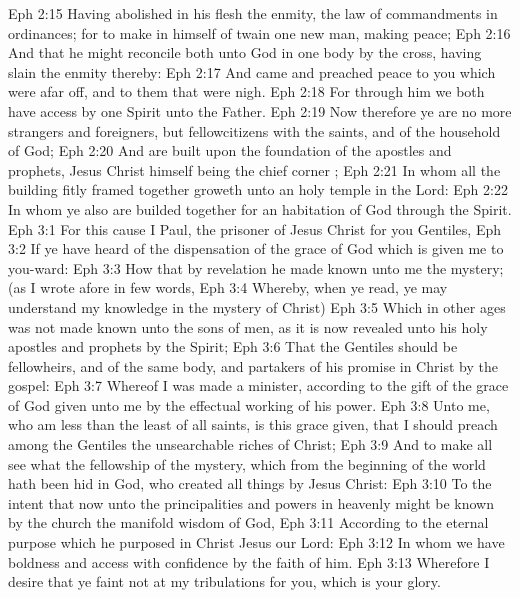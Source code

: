 \vs Eph 2:15 Having abolished in his flesh the enmity,  the law of commandments  in ordinances; for to make in himself of twain one new man,  making peace;
\vs Eph 2:16 And that he might reconcile both unto God in one body by the cross, having slain the enmity thereby:
\vs Eph 2:17 And came and preached peace to you which were afar off, and to them that were nigh.
\vs Eph 2:18 For through him we both have access by one Spirit unto the Father.
\vs Eph 2:19 Now therefore ye are no more strangers and foreigners, but fellowcitizens with the saints, and of the household of God;
\vs Eph 2:20 And are built upon the foundation of the apostles and prophets, Jesus Christ himself being the chief corner ;
\vs Eph 2:21 In whom all the building fitly framed together groweth unto an holy temple in the Lord:
\vs Eph 2:22 In whom ye also are builded together for an habitation of God through the Spirit.
\vs Eph 3:1 For this cause I Paul, the prisoner of Jesus Christ for you Gentiles,
\vs Eph 3:2 If ye have heard of the dispensation of the grace of God which is given me to you-ward:
\vs Eph 3:3 How that by revelation he made known unto me the mystery; (as I wrote afore in few words,
\vs Eph 3:4 Whereby, when ye read, ye may understand my knowledge in the mystery of Christ)
\vs Eph 3:5 Which in other ages was not made known unto the sons of men, as it is now revealed unto his holy apostles and prophets by the Spirit;
\vs Eph 3:6 That the Gentiles should be fellowheirs, and of the same body, and partakers of his promise in Christ by the gospel:
\vs Eph 3:7 Whereof I was made a minister, according to the gift of the grace of God given unto me by the effectual working of his power.
\vs Eph 3:8 Unto me, who am less than the least of all saints, is this grace given, that I should preach among the Gentiles the unsearchable riches of Christ;
\vs Eph 3:9 And to make all  see what  the fellowship of the mystery, which from the beginning of the world hath been hid in God, who created all things by Jesus Christ:
\vs Eph 3:10 To the intent that now unto the principalities and powers in heavenly  might be known by the church the manifold wisdom of God,
\vs Eph 3:11 According to the eternal purpose which he purposed in Christ Jesus our Lord:
\vs Eph 3:12 In whom we have boldness and access with confidence by the faith of him.
\vs Eph 3:13 Wherefore I desire that ye faint not at my tribulations for you, which is your glory.
